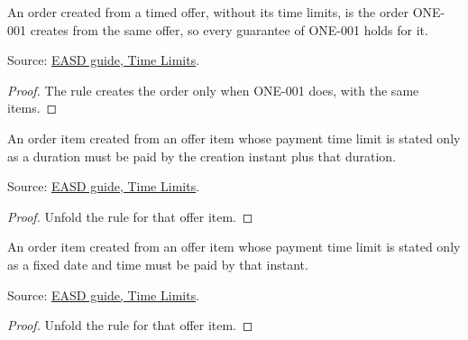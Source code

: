 \begin{theorem}
  \label{thm:offers-create-order-is-accept}
  An order created from a timed offer, without its time limits, is the order
  ONE-001 creates from the same offer, so every guarantee of ONE-001 holds
  for it.

  Source: \href{https://standards.atlassian.net/wiki/spaces/EASD/pages/574423066/Time+Limits}{EASD guide, Time Limits}.
\end{theorem}
\begin{proof}
  The rule creates the order only when ONE-001 does, with the same items.
\end{proof}

\begin{theorem}
  \label{thm:offers-create-duration}
  An order item created from an offer item whose payment time limit is
  stated only as a duration must be paid by the creation instant plus that
  duration.

  Source: \href{https://standards.atlassian.net/wiki/spaces/EASD/pages/574423066/Time+Limits}{EASD guide, Time Limits}.
\end{theorem}
\begin{proof}
  Unfold the rule for that offer item.
\end{proof}

\begin{theorem}
  \label{thm:offers-create-fixed}
  An order item created from an offer item whose payment time limit is
  stated only as a fixed date and time must be paid by that instant.

  Source: \href{https://standards.atlassian.net/wiki/spaces/EASD/pages/574423066/Time+Limits}{EASD guide, Time Limits}.
\end{theorem}
\begin{proof}
  Unfold the rule for that offer item.
\end{proof}


